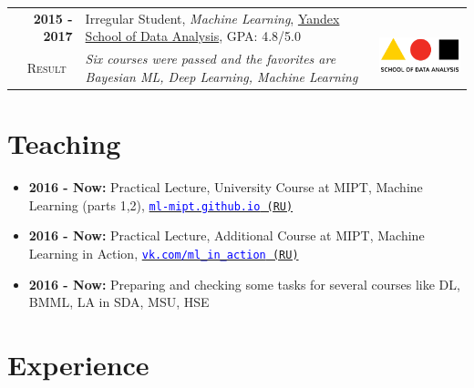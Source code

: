 \documentclass[a4paper,10pt]{article} %
\begin{document}
\begin{tabular}{rp{14cm}c}	
\textbf{2015 -  2017} & Irregular Student, \emph{Machine Learning}, \href{https://yandexdataschool.com/}{Yandex School of Data Analysis}, GPA: 4.8/5.0& \multirow{2}{*}{~~\includegraphics[scale=0.25]{img/shad}}\\
\textsc{Result}~& \emph{Six courses were passed and the favorites are Bayesian ML, Deep Learning, Machine Learning}
\end{tabular}

\section{Teaching}
\begin{itemize}
	\item \textbf{2016 - Now:} Practical Lecture, University Course at MIPT, Machine Learning (parts 1,2), \href{https://ml-mipt.github.io/}{\texttt{\textcolor{blue}{ml-mipt.github.io} (RU)}}
	\item \textbf{2016 - Now:} Practical Lecture, Additional Course at MIPT, Machine Learning in Action, \href{https://vk.com/data_mining_in_action}{\texttt{\textcolor{blue}{vk.com/ml\_in\_action} (RU)}}
	\item \textbf{2016 - Now:} Preparing and checking some tasks for several courses like DL, BMML, LA in SDA, MSU, HSE
\end{itemize}

\section{Experience}
\end{document}
